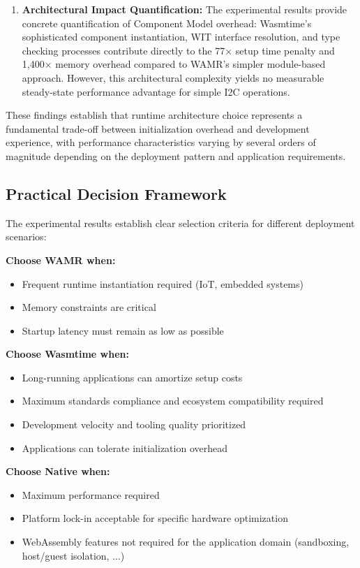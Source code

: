 \begin{enumerate}
    \item \textbf{Architectural Impact Quantification:} The experimental results provide concrete quantification of Component Model overhead: Wasmtime's sophisticated component instantiation, WIT interface resolution, and type checking processes contribute directly to the 77× setup time penalty and 1,400× memory overhead compared to WAMR's simpler module-based approach. However, this architectural complexity yields no measurable steady-state performance advantage for simple I2C operations.
\end{enumerate}

These findings establish that runtime architecture choice represents a fundamental trade-off between initialization overhead and development experience, with performance characteristics varying by several orders of magnitude depending on the deployment pattern and application requirements.

\subsection{Practical Decision Framework}
\label{subsec:decision-framework}

The experimental results establish clear selection criteria for different deployment scenarios:

\textbf{Choose WAMR when:}
\begin{itemize}
    \item Frequent runtime instantiation required (IoT, embedded systems)
    \item Memory constraints are critical 
    \item Startup latency must remain as low as possible
\end{itemize}

\textbf{Choose Wasmtime when:}
\begin{itemize}
    \item Long-running applications can amortize setup costs
    \item Maximum standards compliance and ecosystem compatibility required
    \item Development velocity and tooling quality prioritized
    \item Applications can tolerate initialization overhead
\end{itemize}

\textbf{Choose Native when:}
\begin{itemize}
    \item Maximum performance required
    \item Platform lock-in acceptable for specific hardware optimization
    \item WebAssembly features not required for the application domain (sandboxing, host/guest isolation, ...)
\end{itemize}

